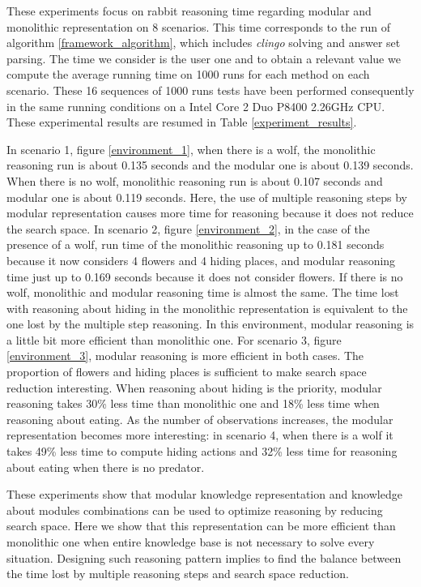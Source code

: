 \documentclass{aamas2012}
\begin{document}
	These experiments focus on rabbit reasoning time regarding modular and monolithic representation on 8 scenarios.
	This time corresponds to the run of algorithm \ref{framework_algorithm}, which includes \emph{clingo} solving and answer set parsing.
	The time we consider is the user one and to obtain a relevant value we compute the average running time on 1000 runs for each method on each scenario.
	These 16 sequences of 1000 runs tests have been performed consequently in the same running conditions on a Intel Core 2 Duo P8400 2.26GHz CPU.
	These experimental results are resumed in Table \ref{experiment_results}.
	
	In scenario 1, figure \ref{environment_1}, when there is a wolf, the monolithic reasoning run is about 0.135 seconds and the modular one is about 0.139 seconds.
	When there is no wolf, monolithic reasoning run is about 0.107 seconds and modular one is about 0.119 seconds.
	Here, the use of multiple reasoning steps by modular representation causes more time for reasoning because it does not reduce the search space.
	In scenario 2, figure \ref{environment_2}, in the case of the presence of a wolf, 
	run time of the monolithic reasoning up to 0.181 seconds because it now considers 4 flowers and 4 hiding places,
	and modular reasoning time just up to 0.169 seconds because it does not consider flowers.
	If there is no wolf, monolithic and modular reasoning time is almost the same.
	The time lost with reasoning about hiding in the monolithic representation is equivalent to the one lost by the multiple step reasoning.
	In this environment, modular reasoning is a little bit more efficient than monolithic one.
	For scenario 3, figure \ref{environment_3}, modular reasoning is more efficient in both cases.
	The proportion of flowers and hiding places is sufficient to make search space reduction interesting.
	When reasoning about hiding is the priority, modular reasoning takes 30\% less time than monolithic one and
	18\% less time when reasoning about eating.
	As the number of observations increases, the modular representation becomes more interesting: in scenario 4, when there is a wolf it takes 49\% less time to
	compute hiding actions and 32\% less time for reasoning about eating when there is no predator.
	
	These experiments show that modular knowledge representation and knowledge about modules combinations can be used to optimize reasoning by reducing search space.
	Here we show that this representation can be more efficient than monolithic one when entire knowledge base is not necessary to solve every situation.
	Designing such reasoning pattern implies to find the balance between the time lost by multiple reasoning steps and search space reduction.
	
\end{document}
